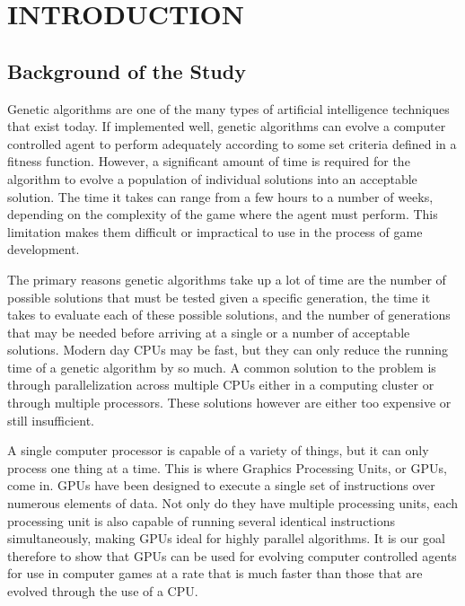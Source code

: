 \chapter{INTRODUCTION}

\section{Background of the Study}

Genetic algorithms are one of the many types of artificial intelligence
techniques that exist today. If implemented well, genetic algorithms can
evolve a computer controlled agent to perform adequately according to some
set criteria defined in a fitness function. However, a significant amount of 
time is required for the algorithm to evolve a population of individual solutions 
into an acceptable solution. The time it takes can range from a few hours to a number
of weeks, depending on the complexity of the game where the agent must perform.
This limitation makes them difficult or impractical to use in the process of
game development.


The primary reasons genetic algorithms take up a lot of time are the number of 
possible solutions that must be tested given a specific generation, the time it 
takes to evaluate each of these possible solutions, and the number of generations 
that may be needed before arriving at a single or a number of acceptable solutions. 
Modern day CPUs may be fast, but they can only reduce
the running time of a genetic algorithm by so much. A common solution to the
problem is through parallelization across multiple CPUs either in a computing
cluster or through multiple processors. These solutions however are either
too expensive or still insufficient.


A single computer processor is capable of a variety of things, but it can only process
one thing at a time. This is where Graphics Processing Units, or GPUs, come in.
GPUs have been designed to execute a single set of instructions over numerous elements
of data. Not only do they have multiple processing units, each processing unit is also
capable of running several identical instructions simultaneously, making GPUs ideal
for highly parallel algorithms. It is our goal therefore to show that GPUs can be used
for evolving computer controlled agents for use in computer games at a rate that is much
faster than those that are evolved through the use of a CPU.

